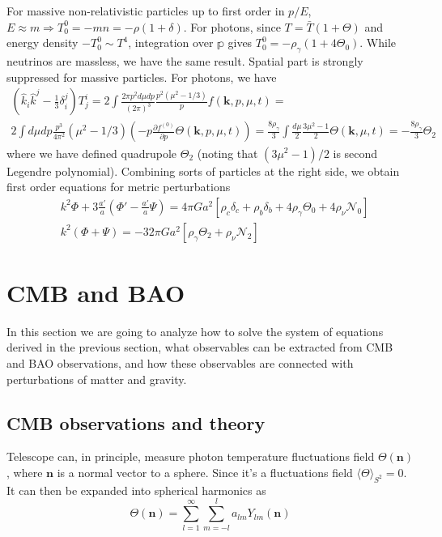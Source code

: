 \documentclass[12pt]{extarticle}
\numberwithin{problem}{section}
\numberwithin{theorem}{section}
\begin{document}
	For massive non-relativistic particles up to first order in $p/E$, $E\approx m\Rightarrow T^0_0 = -mn = -\rho(1 + \delta)$. For photons, since $T = \bar{T}(1 + \Theta)$ and energy density $-T^0_0\sim T^4$, integration over $\mathbb{p}$ gives $T^0_0 = -\rho_\gamma(1 + 4\Theta_0)$. While neutrinos are massless, we have the same result. Spatial part is strongly suppressed for massive particles. For photons, we have
	\begin{multline}
		(\hat{k}_i\hat{k}^j - \frac{1}{3}\delta_i^j)T^i_j = 2\int\frac{2\pi p^2 d\mu dp}{(2\pi)^3}\frac{p^2(\mu^2 - 1/3)}{p}f(\mathbf{k}, p, \mu, t) =\\
		2\int d\mu dp\frac{p^3}{4\pi^2}(\mu^2 - 1/3)\left(-p\frac{\partial f^{(0)}}{\partial p}\Theta(\mathbf{k}, p, \mu, t)\right) = \frac{8\rho_\gamma}{3}\int \frac{d\mu}{2} \frac{3\mu^2 - 1}{2}\Theta(\mathbf{k}, \mu, t) = -\frac{8\rho_\gamma}{3}\Theta_2
	\end{multline}
	where we have defined quadrupole $\Theta_2$ (noting that $(3\mu^2 - 1) / 2$ is second Legendre polynomial). Combining sorts of particles at the right side, we obtain first order equations for metric perturbations
	\begin{align}
		& k^2\Phi + 3\frac{a'}{a}\left(\Phi' - \frac{a'}{a}\Psi\right) = 4\pi Ga^2[\rho_c\delta_c + \rho_b\delta_b + 4\rho_\gamma\Theta_0 + 4\rho_\nu\mathcal{N}_0] \\
		& k^2(\Phi + \Psi) = -32\pi Ga^2[\rho_\gamma\Theta_2 + \rho_\nu\mathcal{N}_2]
	\end{align}

	\section{CMB and BAO}
	In this section we are going to analyze how to solve the system of equations derived in the previous section, what observables can be extracted from CMB and BAO observations, and how these observables are connected with perturbations of matter and gravity.
	
	\subsection{CMB observations and theory}
	Telescope can, in principle, measure photon temperature fluctuations field $\Theta(\mathbf{n})$, where $\mathbf{n}$ is a normal vector to a sphere. Since it's a fluctuations field $\langle\Theta\rangle_{S^2} = 0$. It can then be expanded into spherical harmonics as 
	\begin{equation}
		\Theta(\mathbf{n}) = \sum_{l=1}^\infty\sum_{m=-l}^l a_{lm}Y_{lm}(\mathbf{n})
	\end{equation}
	
\end{document}
